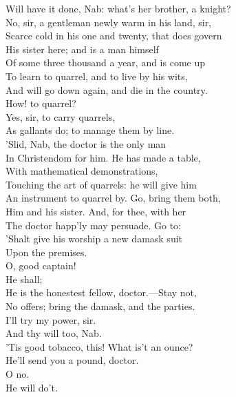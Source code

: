 \documentclass[a4paper,oneside]{memoir}
\begin{document}
\begin{drama*}
Will have it done, Nab: what's her brother, a knight?\\
\druggerspeaks No, sir, a gentleman newly warm in his land, sir,\\
Scarce cold in his one and twenty, that does govern\\
His sister here; and is a man himself\\
Of some three thousand a year, and is come up\\
To learn to quarrel, and to live by his wits,\\
And will go down again, and die in the country.\\
\facespeaks How! to quarrel?\\
\druggerspeaks {} Yes, sir, to carry quarrels,\\
As gallants do; to manage them by line.\\
\facespeaks 'Slid, Nab, the doctor is the only man\\
In Christendom for him. He has made a table,\\
With mathematical demonstrations,\\
Touching the art of quarrels: he will give him\\
An instrument to quarrel by. Go, bring them both,\\
Him and his sister. And, for thee, with her\\
The doctor happ'ly may persuade. Go to:\\
'Shalt give his worship a new damask suit\\
Upon the premises.\\
\subtlespeaks {} O, good captain!\\
\facespeaks {} He shall;\\
He is the honestest fellow, doctor.---Stay not,\\
No offers; bring the damask, and the parties.\\
\druggerspeaks I'll try my power, sir.\\
\facespeaks {} And thy will too, Nab.\\
\subtlespeaks 'Tis good tobacco, this! What is't an ounce?\\
\facespeaks He'll send you a pound, doctor.\\
\subtlespeaks {} O no.\\
\facespeaks {} He will do't.\\

\end{drama*}
\end{document}
